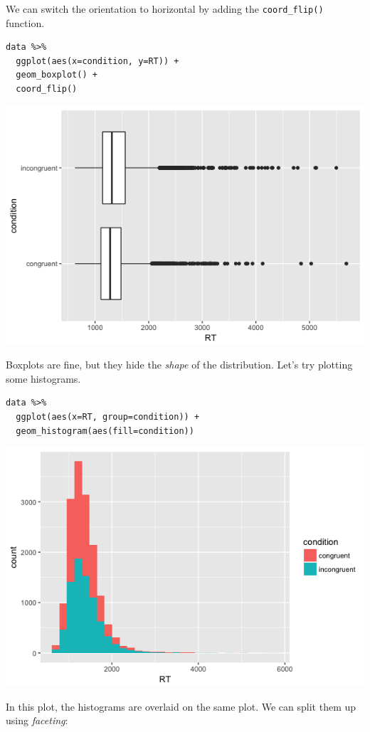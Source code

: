 \documentclass[11pt]{article}
\begin{document}
We can switch the orientation to horizontal by adding the \texttt{coord\_flip()} function.

\begin{verbatim}
data %>%
  ggplot(aes(x=condition, y=RT)) +
  geom_boxplot() +
  coord_flip()
\end{verbatim}

\includegraphics[width=.9\linewidth]{figures/week5/boxplotHorizontal.png}

Boxplots are fine, but they hide the \emph{shape} of the distribution.  Let's try plotting some histograms.

\begin{verbatim}
data %>%
  ggplot(aes(x=RT, group=condition)) +
  geom_histogram(aes(fill=condition))
\end{verbatim}

\includegraphics[width=.9\linewidth]{figures/week5/histogram.png}

In this plot, the histograms are overlaid on the same plot.  We can split them up using \emph{faceting}:
\end{document}
